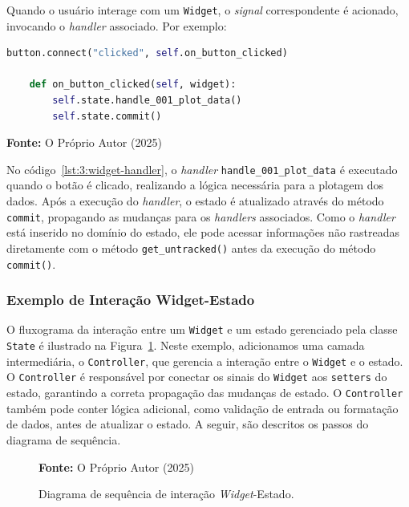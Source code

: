 Quando o usuário interage com um \texttt{Widget}, o \textit{signal} correspondente é acionado, invocando o \textit{handler} associado. Por exemplo:

\begin{center}
    \begin{lstlisting}[language=Python, caption=Exemplo da conexão do \textit{signal} \texttt{clicked} de um \textit{Widget} e um \textit{handler}., label=lst:3:widget-handler]
    button.connect("clicked", self.on_button_clicked)
    
    def on_button_clicked(self, widget):
        self.state.handle_001_plot_data()
        self.state.commit()
    \end{lstlisting}
    \centerline{\textbf{Fonte:} O Próprio Autor (2025)}
\end{center}

No código~\ref{lst:3:widget-handler}, o \textit{handler} \texttt{handle\_001\_plot\_data} é executado quando o botão é clicado, realizando a lógica necessária para a plotagem dos dados. Após a execução do \textit{handler}, o estado é atualizado através do método \texttt{commit}, propagando as mudanças para os \textit{handlers} associados. Como o \textit{handler} está inserido no domínio do estado, ele pode acessar informações não rastreadas diretamente com o método \texttt{get\_untracked()} antes da execução do método \texttt{commit()}.

\subsubsection{Exemplo de Interação Widget-Estado}

O fluxograma da interação entre um \texttt{Widget} e um estado gerenciado pela classe \texttt{State} é ilustrado na Figura~\ref{fig:3:cd-state-flowchart}. Neste exemplo, adicionamos uma camada intermediária, o \texttt{Controller}, que gerencia a interação entre o \texttt{Widget} e o estado. O \texttt{Controller} é responsável por conectar os sinais do \texttt{Widget} aos \texttt{setters} do estado, garantindo a correta propagação das mudanças de estado. O \texttt{Controller} também pode conter lógica adicional, como validação de entrada ou formatação de dados, antes de atualizar o estado. A seguir, são descritos os passos do diagrama de sequência.

\begin{figure}[h!]
    \centerline{}
    \caption{Diagrama de sequência de interação \textit{Widget}-Estado.}
    \centerline{\textbf{Fonte:} O Próprio Autor (2025)}
    \label{fig:3:cd-state-flowchart}
\end{figure}

